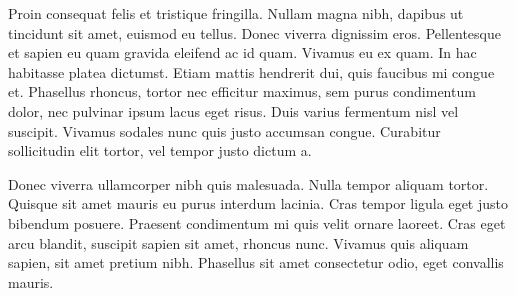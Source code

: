 \documentclass{novanarrative}
\begin{document}
Proin consequat felis et tristique fringilla. Nullam magna nibh, dapibus ut tincidunt sit amet, euismod eu tellus. Donec viverra dignissim eros. Pellentesque et sapien eu quam gravida eleifend ac id quam. Vivamus eu ex quam. In hac habitasse platea dictumst. Etiam mattis hendrerit dui, quis faucibus mi congue et. Phasellus rhoncus, tortor nec efficitur maximus, sem purus condimentum dolor, nec pulvinar ipsum lacus eget risus. Duis varius fermentum nisl vel suscipit. Vivamus sodales nunc quis justo accumsan congue. Curabitur sollicitudin elit tortor, vel tempor justo dictum a.

Donec viverra ullamcorper nibh quis malesuada. Nulla tempor aliquam tortor. Quisque sit amet mauris eu purus interdum lacinia. Cras tempor ligula eget justo bibendum posuere. Praesent condimentum mi quis velit ornare laoreet. Cras eget arcu blandit, suscipit sapien sit amet, rhoncus nunc. Vivamus quis aliquam sapien, sit amet pretium nibh. Phasellus sit amet consectetur odio, eget convallis mauris.
\end{document}
